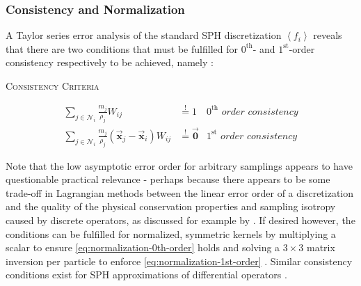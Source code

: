 \documentclass[oneside, a4paper]{book}
\newcommand{\equationnamed}[2]{%
  \setlength{\fboxsep}{2pt} %
  \setlength{\fboxrule}{0.01pt}
  \begin{center}
    \begin{minipage}{\textwidth}
      \begin{center}\textsc{#1}\end{center}
      #2
    \end{minipage}
  \end{center}
}
\newcommand\angled[1]{\left\langle#1\right\rangle}
\newcommand\vek[1]{\vec{\bm{#1}}}
\newcommand\br[1]{\left(#1\right)}
\begin{document}
    \subsubsection{Consistency and Normalization}
    A Taylor series error analysis of the standard SPH discretization $\angled{f_i}$ reveals that there are two conditions that must be fulfilled for $0^{\text{th}}$- and $1^{\text{st}}$-order consistency respectively to be achieved, namely \autocite{price-2012}:
    \equationnamed{Consistency Criteria}{
      \vspace{-0.3cm}
      \begin{align}
        \sum_{j\in\mathcal{N}_i} \frac{m_j}{\rho_j}W_{ij} &\overset{!}{=} 1 
        &\textit{$0^{\text{th}}$ order consistency}
        \label{eq:normalization-0th-order}\\
        \sum_{j\in\mathcal{N}_i} \frac{m_j}{\rho_j}\br{\vek{x}_j - \vek{x}_i}W_{ij} &\overset{!}{=} \vek{0}
        &\textit{$1^{\text{st}}$ order consistency}
        \label{eq:normalization-1st-order}
      \end{align}
    }
    Note that the low asymptotic error order for arbitrary samplings appears to have questionable practical relevance \autocite{tutorial2019} - perhaps because there appears to be some trade-off in Lagrangian methods between the linear error order of a discretization and the quality of the physical conservation properties and sampling isotropy caused by discrete operators, as discussed for example by \autocite[Price]{price-2012}. If desired however, the conditions can be fulfilled for normalized, symmetric kernels by multiplying a scalar to ensure \autoref{eq:normalization-0th-order} holds and solving a $3\times 3$ matrix inversion per particle to enforce \autoref{eq:normalization-1st-order} \autocites{tutorial2019}{price-2012}. Similar consistency conditions exist for SPH approximations of differential operators \autocite{price-2012}.
\end{document}
